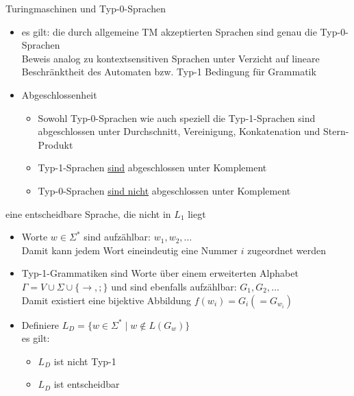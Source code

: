 \begin{frame}{Turingmaschinen und Typ-0-Sprachen}
	\begin{itemize}
		\item es gilt: die durch allgemeine TM akzeptierten Sprachen sind genau die Typ-0-Sprachen\\
		Beweis analog zu kontextsensitiven Sprachen unter Verzicht auf lineare Beschränktheit des Automaten bzw. Typ-1 Bedingung für Grammatik
		\item Abgeschlossenheit
		\begin{itemize}
			\item Sowohl Typ-0-Sprachen wie auch speziell die Typ-1-Sprachen sind abgeschlossen unter Durchschnitt, Vereinigung, Konkatenation und Stern-Produkt
			\item Typ-1-Sprachen \underline{sind} abgeschlossen unter Komplement
			\item Typ-0-Sprachen \underline{sind nicht} abgeschlossen unter Komplement
		\end{itemize}
	\end{itemize}
\end{frame}

\begin{frame}{eine entscheidbare Sprache, die nicht in $L_1$ liegt}
	\begin{itemize}
		\item Worte $w \in \Sigma^*$ sind aufzählbar: $w_1, w_2, \ldots$\\
		Damit kann jedem Wort eineindeutig eine Nummer $i$ zugeordnet werden
		\item Typ-1-Grammatiken sind Worte über einem erweiterten Alphabet $\Gamma = V \cup \Sigma \cup \{\rightarrow, ;\}$ und sind ebenfalls aufzählbar: $G_1, G_2, \ldots$\\
		Damit existiert eine bijektive Abbildung $f(w_i) = G_i (= G_{w_i})$
		\item Definiere $L_D=\{w \in \Sigma^* \mid w \notin L(G_w)\}$\\
		es gilt:
		\begin{itemize}
			\item $L_D$ ist nicht Typ-1
			\item $L_D$ ist entscheidbar
		\end{itemize}
	\end{itemize}
\end{frame}

